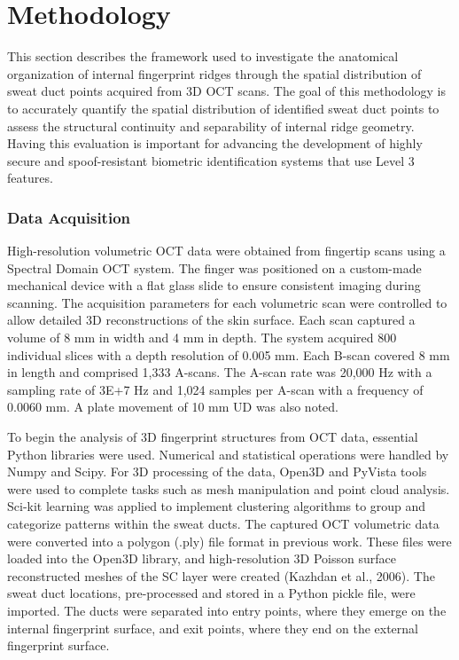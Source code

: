\chapter{Methodology}

This section describes the framework used to investigate the anatomical organization of internal fingerprint ridges through the spatial distribution of sweat duct points acquired from 3D OCT scans. The goal of this methodology is to accurately quantify the spatial distribution of identified sweat duct points to assess the structural continuity and separability of internal ridge geometry. Having this evaluation is important for advancing the development of highly secure and spoof-resistant biometric identification systems that use Level 3 features.

\subsection{Data Acquisition}

High-resolution volumetric OCT data were obtained from fingertip scans using a Spectral Domain OCT system. The finger was positioned on a custom-made mechanical device with a flat glass slide to ensure consistent imaging during scanning. The acquisition parameters for each volumetric scan were controlled to allow detailed 3D reconstructions of the skin surface. Each scan captured a volume of 8 mm in width and 4 mm in depth. The system acquired 800 individual slices with a depth resolution of 0.005 mm. Each B-scan covered 8 mm in length and comprised 1,333 A-scans. The A-scan rate was 20,000 Hz with a sampling rate of 3E+7 Hz and 1,024 samples per A-scan with a frequency of 0.0060 mm. A plate movement of 10 mm UD was also noted.

To begin the analysis of 3D fingerprint structures from OCT data, essential Python libraries were used. Numerical and statistical operations were handled by Numpy and Scipy. For 3D processing of the data, Open3D and PyVista tools were used to complete tasks such as mesh manipulation and point cloud analysis. Sci-kit learning was applied to implement clustering algorithms to group and categorize patterns within the sweat ducts. The captured OCT volumetric data were converted into a polygon (.ply) file format in previous work. These files were loaded into the Open3D library, and high-resolution 3D Poisson surface reconstructed meshes of the SC layer were created (Kazhdan et al., 2006). The sweat duct locations, pre-processed and stored in a Python pickle file, were imported. The ducts were separated into entry points, where they emerge on the internal fingerprint surface, and exit points, where they end on the external fingerprint surface.

